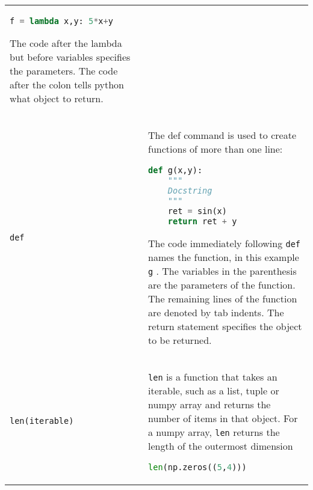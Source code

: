 \begin{tabular}[]{@{}ll@{}}
\begin{minipage}[t]{0.77\columnwidth}
\begin{lstlisting}[language=Python]
f = lambda x,y: 5*x+y
\end{lstlisting}

The code after the lambda but before variables specifies the parameters.
The code after the colon tells python what object to return.\strut
\end{minipage}\tabularnewline
\begin{minipage}[t]{0.17\columnwidth}\raggedright\strut
\lstinline!def!\strut
\end{minipage} & \begin{minipage}[t]{0.77\columnwidth}\raggedright\strut
The def command is used to create functions of more than one line:

\begin{lstlisting}[language=Python]
def g(x,y):
    """
    Docstring
    """
    ret = sin(x)
    return ret + y
\end{lstlisting}

The code immediately following \lstinline!def! names the function, in
this example \lstinline!g! . The variables in the parenthesis are the
parameters of the function. The remaining lines of the function are
denoted by tab indents. The return statement specifies the object to be
returned.\strut
\end{minipage}\tabularnewline
\begin{minipage}[t]{0.17\columnwidth}\raggedright\strut
\lstinline!len(iterable)!\strut
\end{minipage} & \begin{minipage}[t]{0.77\columnwidth}\raggedright\strut
\lstinline!len! is a function that takes an iterable, such as a list,
tuple or numpy array and returns the number of items in that object. For
a numpy array, \lstinline!len! returns the length of the outermost
dimension

\begin{lstlisting}[language=Python]
len(np.zeros((5,4)))
\end{lstlisting}


\end{minipage}
\end{tabular}

